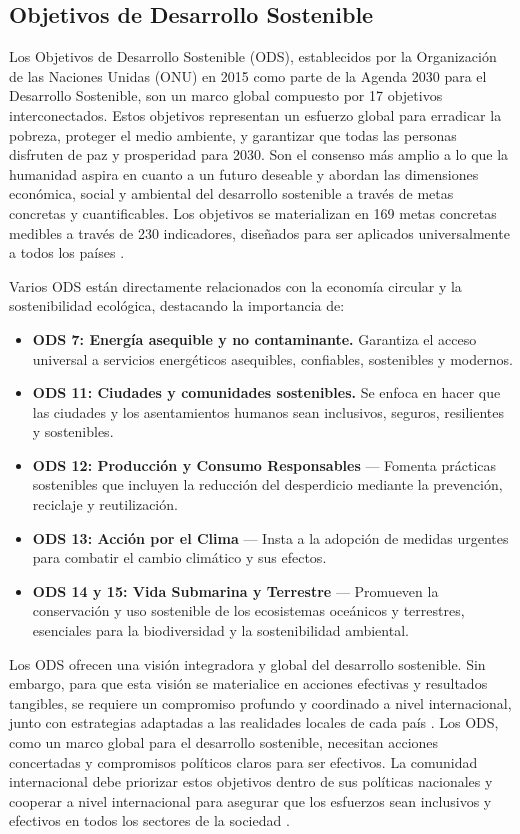 \documentclass[main.tex]{subfiles}
\begin{document}
\subsection{Objetivos de Desarrollo Sostenible}
Los Objetivos de Desarrollo Sostenible (ODS), establecidos por la Organización de las Naciones Unidas (ONU) en 2015 como parte de la Agenda 2030 para el Desarrollo Sostenible, son un marco global compuesto por 17 objetivos interconectados. Estos objetivos representan un esfuerzo global para erradicar la pobreza, proteger el medio ambiente, y garantizar que todas las personas disfruten de paz y prosperidad para 2030. Son el consenso más amplio a lo que la humanidad aspira en cuanto a un futuro deseable y abordan las dimensiones económica, social y ambiental del desarrollo sostenible a través de metas concretas y cuantificables. Los objetivos se materializan en 169 metas concretas medibles a través de 230 indicadores, diseñados para ser aplicados universalmente a todos los países  \cite{onu2024ods gil2018objetivos}.

Varios ODS están directamente relacionados con la economía circular y la sostenibilidad ecológica, destacando la importancia de:

\begin{itemize}
		\item \textbf{ODS 7: Energía asequible y no contaminante.} Garantiza el acceso universal a servicios energéticos asequibles, confiables, sostenibles y modernos.
    \item \textbf{ODS 11: Ciudades y comunidades sostenibles.} Se enfoca en hacer que las ciudades y los asentamientos humanos sean inclusivos, seguros, resilientes y sostenibles.
    \item \textbf{ODS 12: Producción y Consumo Responsables} — Fomenta prácticas sostenibles que incluyen la reducción del desperdicio mediante la prevención, reciclaje y reutilización.
    \item \textbf{ODS 13: Acción por el Clima} — Insta a la adopción de medidas urgentes para combatir el cambio climático y sus efectos.
    \item \textbf{ODS 14 y 15: Vida Submarina y Terrestre} — Promueven la conservación y uso sostenible de los ecosistemas oceánicos y terrestres, esenciales para la biodiversidad y la sostenibilidad ambiental.
\end{itemize}

Los ODS ofrecen una visión integradora y global del desarrollo sostenible. Sin embargo, para que esta visión se materialice en acciones efectivas y resultados tangibles, se requiere un compromiso profundo y coordinado a nivel internacional, junto con estrategias adaptadas a las realidades locales de cada país \cite{gil2018objetivos}.
Los ODS, como un marco global para el desarrollo sostenible, necesitan acciones concertadas y compromisos políticos claros para ser efectivos. La comunidad internacional debe priorizar estos objetivos dentro de sus políticas nacionales y cooperar a nivel internacional para asegurar que los esfuerzos sean inclusivos y efectivos en todos los sectores de la sociedad \cite{onu2024ods}.
\end{document}
